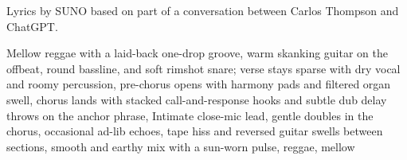 
\label{sec:multiply-the-delay}
\begin{notes}
Lyrics by SUNO based on part of a conversation between Carlos Thompson and ChatGPT.
\end{notes}
\begin{style}
Mellow reggae with a laid-back one-drop groove, warm skanking guitar on the offbeat, round bassline, and soft rimshot snare; verse stays sparse with dry vocal and roomy percussion, pre-chorus opens with harmony pads and filtered organ swell, chorus lands with stacked call-and-response hooks and subtle dub delay throws on the anchor phrase, Intimate close-mic lead, gentle doubles in the chorus, occasional ad-lib echoes, tape hiss and reversed guitar swells between sections, smooth and earthy mix with a sun-worn pulse, reggae, mellow
\end{style}
